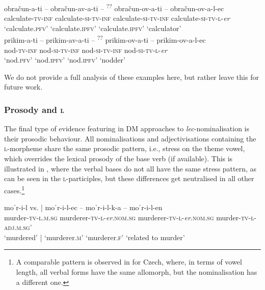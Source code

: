 \documentclass[output=paper,colorlinks,citecolor=brown]{langscibook}
\begin{document}
\ea \label{ex:izterjevalec}
\ea \glll  obračun-a-ti -- obračun-av-a-ti  --  \textsuperscript{??}\hspace{-2pt} obračun-ov-a-ti  --  obračun-ov-a-l-ec \\
calculate-\textsc{tv}-\textsc{inf} {} calculate-\textsc{si}-\textsc{tv}-\textsc{inf}  {} {} calculate-\textsc{si}-\textsc{tv}-\textsc{inf}  {}  calculate-\textsc{si}-\textsc{tv}-\textsc{l}-\textit{er}\\ 
`calculate.\textsc{pfv}' {}  `calculate.\textsc{ipfv}' {}  {} `calculate.\textsc{ipfv}' {} `calculator'    \\
\ex \glll prikim-a-ti -- prikim-av-a-ti -- \textsuperscript{??}\hspace{-2pt} prikim-ov-a-ti -- prikim-ov-a-l-ec\\
nod-\textsc{tv}-\textsc{inf}  {}  nod-\textsc{si}-\textsc{tv}-\textsc{inf} {} {}  nod-\textsc{si}-\textsc{tv}-\textsc{inf}   {} nod-\textsc{si}-\textsc{tv}-\textsc{l}-\textit{er}\\
`nod.\textsc{pfv}' {} `nod.\textsc{ipfv}' {}  {} `nod.\textsc{ipfv}' {} `nodder'\\
\z
\z

\noindent We do not provide a full analysis of these examples here, but rather leave this for future work.

\subsubsection{Prosody and \textsc{l}\label{sec:dmprosody}}
 

The final type of evidence featuring in DM approaches to \textit{lec}-nominalisation is their prosodic behaviour. All nominalisations and adjectivisations containing the \textsc{l-}morpheme share the same prosodic pattern, i.e., stress on the theme vowel, which overrides the lexical prosody of the base verb (if available). This is illustrated in , where the verbal bases do not all have the same stress pattern, as can be seen in the \textsc{l}-participles, but these differences get neutralised in all other cases.\footnote{A comparable pattern is observed in \citet{caha2022prefixes} for Czech, where, in terms of vowel length, all verbal forms have the same allomorph, but the nominalisation has a different one.} 



\ea \label{ex:pros1}
\ea
\glll moˈr-i-l vs. | moˈr-i-l-ec -- moˈr-i-l-k-a -- moˈr-i-l-en\\
murder-\textsc{tv-l.m.sg} {} {} murderer-\textsc{tv-l}-\textit{er}.\textsc{nom.sg} {} murderer-\textsc{tv-l}-\textit{er}.\textsc{nom.sg} {} murder-\textsc{tv-l-adj.m.sg}'\\
`murdered' {} | `murderer.\textsc{m}' {} `murderer.\textsc{f}' {} `related{ }to{ }murder'\\
\label{ex:mor1}
\end{document}

